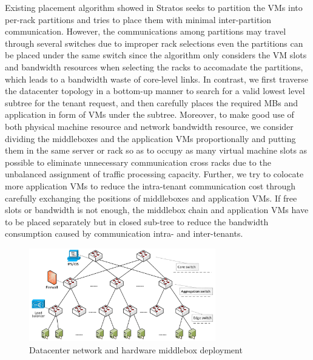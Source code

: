 \documentclass[review]{elsarticle}
\begin{document}
Existing placement algorithm showed in Stratos \cite{stratos12} seeks to partition the VMs into per-rack partitions and tries to place them with minimal inter-partition communication. However, the communications among partitions may travel through several switches due to improper rack selections even the partitions can be placed under the same switch since the algorithm only considers the VM slots and bandwidth resources when selecting the racks to accomadate the partitions, which leads to a bandwidth waste of core-level links.  
In contrast, %
we first traverse the datacenter topology in a bottom-up manner to search for a valid lowest level subtree for the tenant request, and then carefully places the required MBs and application in form of VMs under the subtree. 
Moreover, to make good use of both physical machine resource and network bandwidth resource, we consider dividing the middleboxes and the application VMs proportionally and putting them in the same server or rack so as to occupy as many virtual machine slots as possible to eliminate unnecessary communication cross racks due to the unbalanced assignment of traffic processing capacity. Further, we try to colocate more application VMs to reduce the intra-tenant communication cost through carefully exchanging the positions of middleboxes and application VMs. If free slots or bandwidth is not enough, the middlebox chain and application VMs have to be placed separately but in closed sub-tree to reduce the bandwidth consumption caused by communication intra- and inter-tenants. 


\begin{figure}
	\centering
		\includegraphics[width=3.2in]{fig/topology.pdf}
	\caption{Datacenter network and hardware middlebox deployment}
	\label{fig:topo}
\end{figure}
\end{document}
